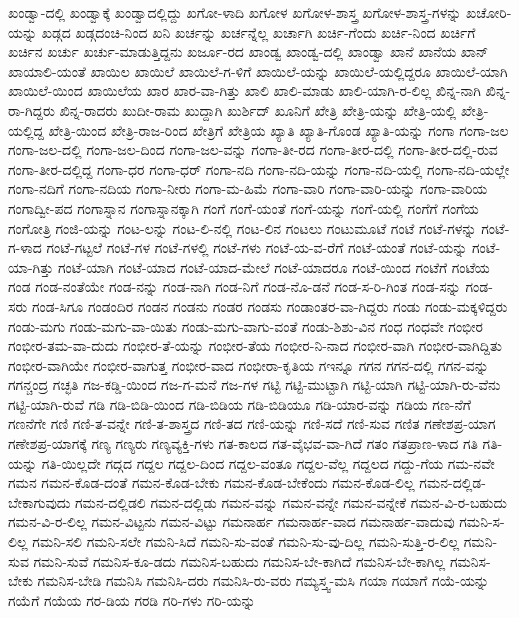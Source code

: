 {ಖಂಡ್ವಾ-ದಲ್ಲಿ
ಖಂಡ್ವಾಕ್ಕೆ
ಖಂಡ್ವಾದಲ್ಲಿದ್ದು
ಖಗೋ-ಳಾದಿ
ಖಗೋಳ
ಖಗೋಳ-ಶಾಸ್ತ್ರ
ಖಗೋಳ-ಶಾಸ್ತ್ರ-ಗಳನ್ನು
ಖಚೋರಿ-ಯನ್ನು
ಖಡ್ಗದ
ಖಡ್ಗದಂಚಿ-ನಿಂದ
ಖನಿ
ಖರ್ಚನ್ನು
ಖರ್ಚನ್ನೆಲ್ಲ
ಖರ್ಚಾಗಿ
ಖರ್ಚಿ-ಗೆಂದು
ಖರ್ಚಿ-ನಿಂದ
ಖರ್ಚಿಗೆ
ಖರ್ಚಿನ
ಖರ್ಚು
ಖರ್ಚು-ಮಾಡುತ್ತಿದ್ದನು
ಖರ್ಜೂ-ರದ
ಖಾಂಡ್ವ
ಖಾಂಡ್ವ-ದಲ್ಲಿ
ಖಾಂಡ್ವಾ
ಖಾನೆ
ಖಾನೆಯ
ಖಾನ್
ಖಾಯಾಲಿ-ಯಂತೆ
ಖಾಯಿಲ
ಖಾಯಿಲೆ
ಖಾಯಿಲೆ-ಗ-ಳಿಗೆ
ಖಾಯಿಲೆ-ಯನ್ನು
ಖಾಯಿಲೆ-ಯಲ್ಲಿದ್ದರೂ
ಖಾಯಿಲೆ-ಯಾಗಿ
ಖಾಯಿಲೆ-ಯಿಂದ
ಖಾಯಿಲೆಯ
ಖಾರ
ಖಾರ-ವಾ-ಗಿತ್ತು
ಖಾಲಿ
ಖಾಲಿ-ಮಾಡು
ಖಾಲಿ-ಯಾಗಿ-ರ-ಲಿಲ್ಲ
ಖಿನ್ನ-ನಾಗಿ
ಖಿನ್ನ-ರಾ-ಗಿದ್ದರು
ಖಿನ್ನ-ರಾದರು
ಖುದೀ-ರಾಮ
ಖುದ್ದಾಗಿ
ಖುರ್ಶಿದ್
ಖೂನಿಗೆ
ಖೇತ್ರಿ
ಖೇತ್ರಿ-ಯನ್ನು
ಖೇತ್ರಿ-ಯಲ್ಲಿ
ಖೇತ್ರಿ-ಯಲ್ಲಿದ್ದ
ಖೇತ್ರಿ-ಯಿಂದ
ಖೇತ್ರಿ-ರಾಜ-ರಿಂದ
ಖೇತ್ರಿಗೆ
ಖೇತ್ರಿಯ
ಖ್ಯಾತಿ
ಖ್ಯಾತಿ-ಗೊಂಡ
ಖ್ಯಾತಿ-ಯನ್ನು
ಗಂಗಾ
ಗಂಗಾ-ಜಲ
ಗಂಗಾ-ಜಲ-ದಲ್ಲಿ
ಗಂಗಾ-ಜಲ-ದಿಂದ
ಗಂಗಾ-ಜಲ-ವನ್ನು
ಗಂಗಾ-ತೀ-ರದ
ಗಂಗಾ-ತೀರ-ದಲ್ಲಿ
ಗಂಗಾ-ತೀರ-ದಲ್ಲಿ-ರುವ
ಗಂಗಾ-ತೀರ-ದಲ್ಲಿದ್ದ
ಗಂಗಾ-ಧರ
ಗಂಗಾ-ಧರ್
ಗಂಗಾ-ನದಿ
ಗಂಗಾ-ನದಿ-ಯನ್ನು
ಗಂಗಾ-ನದಿ-ಯಲ್ಲಿ
ಗಂಗಾ-ನದಿ-ಯಲ್ಲೇ
ಗಂಗಾ-ನದಿಗೆ
ಗಂಗಾ-ನದಿಯ
ಗಂಗಾ-ನೀರು
ಗಂಗಾ-ಮ-ಹಿಮೆ
ಗಂಗಾ-ವಾರಿ
ಗಂಗಾ-ವಾರಿ-ಯನ್ನು
ಗಂಗಾ-ವಾರಿಯ
ಗಂಗಾದ್ವೀ-ಪದ
ಗಂಗಾಸ್ನಾನ
ಗಂಗಾಸ್ನಾನಕ್ಕಾಗಿ
ಗಂಗೆ
ಗಂಗೆ-ಯಂತೆ
ಗಂಗೆ-ಯನ್ನು
ಗಂಗೆ-ಯಲ್ಲಿ
ಗಂಗೆಗೆ
ಗಂಗೆಯ
ಗಂಗೋತ್ರಿ
ಗಂಜಿ-ಯನ್ನು
ಗಂಟ-ಲನ್ನು
ಗಂಟ-ಲಿ-ನಲ್ಲಿ
ಗಂಟ-ಲಿನ
ಗಂಟಲು
ಗಂಟುಮೂಟೆ
ಗಂಟೆ
ಗಂಟೆ-ಗಳನ್ನು
ಗಂಟೆ-ಗ-ಳಾದ
ಗಂಟೆ-ಗಟ್ಟಲೆ
ಗಂಟೆ-ಗಳ
ಗಂಟೆ-ಗಳಲ್ಲಿ
ಗಂಟೆ-ಗಳು
ಗಂಟೆ-ಯ-ವ-ರೆಗೆ
ಗಂಟೆ-ಯಂತೆ
ಗಂಟೆ-ಯನ್ನು
ಗಂಟೆ-ಯಾ-ಗಿತ್ತು
ಗಂಟೆ-ಯಾಗಿ
ಗಂಟೆ-ಯಾದ
ಗಂಟೆ-ಯಾದ-ಮೇಲೆ
ಗಂಟೆ-ಯಾದರೂ
ಗಂಟೆ-ಯಿಂದ
ಗಂಟೆಗೆ
ಗಂಟೆಯ
ಗಂಡ
ಗಂಡ-ನಂತೆಯೇ
ಗಂಡ-ನನ್ನು
ಗಂಡ-ನಾಗಿ
ಗಂಡ-ನಿಗೆ
ಗಂಡ-ನೊ-ಡನೆ
ಗಂಡ-ಸ-ರಿ-ಗಿಂತ
ಗಂಡ-ಸನ್ನು
ಗಂಡ-ಸರು
ಗಂಡ-ಸಿಗೂ
ಗಂಡಂದಿರ
ಗಂಡನ
ಗಂಡನು
ಗಂಡರ
ಗಂಡಸು
ಗಂಡಾಂತರ-ವಾ-ಗಿದ್ದರು
ಗಂಡು
ಗಂಡು-ಮಕ್ಕಳಿದ್ದರು
ಗಂಡು-ಮಗು
ಗಂಡು-ಮಗು-ವಾ-ಯಿತು
ಗಂಡು-ಮಗು-ವಾಗು-ವಂತೆ
ಗಂಡು-ಶಿಶು-ವಿನ
ಗಂಧ
ಗಂಧವೇ
ಗಂಭೀರ
ಗಂಭೀರ-ತಮ-ವಾ-ದುದು
ಗಂಭೀರ-ತೆ-ಯನ್ನು
ಗಂಭೀರ-ತೆಯ
ಗಂಭೀರ-ನಿ-ನಾದ
ಗಂಭೀರ-ವಾಗಿ
ಗಂಭೀರ-ವಾಗಿದ್ದಿತು
ಗಂಭೀರ-ವಾಗಿಯೇ
ಗಂಭೀರ-ವಾಗುತ್ತ
ಗಂಭೀರ-ವಾದ
ಗಂಭೀರಾ-ಕೃತಿಯ
ಗಇನ್ನೂ
ಗಗನ
ಗಗನ-ದಲ್ಲಿ
ಗಗನ-ವನ್ನು
ಗಗನ್ಚಂದ್ರ
ಗಚ್ಛತಿ
ಗಜ-ಕಡ್ಡಿ-ಯಿಂದ
ಗಜ-ಗ-ಮನೆ
ಗಜ-ಗಳ
ಗಟ್ಟಿ
ಗಟ್ಟಿ-ಮುಟ್ಟಾಗಿ
ಗಟ್ಟಿ-ಯಾಗಿ
ಗಟ್ಟಿ-ಯಾಗಿ-ರು-ವೆನು
ಗಟ್ಟಿ-ಯಾಗಿ-ರುವೆ
ಗಡಿ
ಗಡಿ-ಬಿಡಿ-ಯಿಂದ
ಗಡಿ-ಬಿಡಿಯ
ಗಡಿ-ಬಿಡಿಯೂ
ಗಡಿ-ಯಾರ-ವನ್ನು
ಗಡಿಯ
ಗಣ-ನೆಗೆ
ಗಣನೆಗೇ
ಗಣಿ
ಗಣಿ-ತ-ವನ್ನೇ
ಗಣಿ-ತ-ಶಾಸ್ತ್ರದ
ಗಣಿ-ತದ
ಗಣಿ-ಯನ್ನು
ಗಣಿ-ಸದೆ
ಗಣಿ-ಸುವ
ಗಣಿತ
ಗಣೇಶಪ್ರ-ಯಾಗ
ಗಣೇಶಪ್ರ-ಯಾಗಕ್ಕೆ
ಗಣ್ಯ
ಗಣ್ಯರು
ಗಣ್ಯವ್ಯಕ್ತಿ-ಗಳು
ಗತ-ಕಾಲದ
ಗತ-ವೈಭವ-ವಾ-ಗಿದೆ
ಗತಂ
ಗತಪ್ರಾಣ-ಳಾದ
ಗತಿ
ಗತಿ-ಯನ್ನು
ಗತಿ-ಯಿಲ್ಲದೇ
ಗದ್ಗದ
ಗದ್ದಲ
ಗದ್ದಲ-ದಿಂದ
ಗದ್ದಲ-ವಂತೂ
ಗದ್ದಲ-ವೆಲ್ಲ
ಗದ್ದಲದ
ಗದ್ದು-ಗೆಯ
ಗಮ-ನವೇ
ಗಮನ
ಗಮನ-ಕೊಡ-ದಂತೆ
ಗಮನ-ಕೊಡ-ಬೇಕು
ಗಮನ-ಕೊಡ-ಬೇಕೆಂದು
ಗಮನ-ಕೊಡ-ಲಿಲ್ಲ
ಗಮನ-ದಲ್ಲಿಡ-ಬೇಕಾಗುವುದು
ಗಮನ-ದಲ್ಲಿಡಲಿ
ಗಮನ-ದಲ್ಲಿಡು
ಗಮನ-ವನ್ನು
ಗಮನ-ವನ್ನೇ
ಗಮನ-ವನ್ನೇಕೆ
ಗಮನ-ವಿ-ರ-ಬಹುದು
ಗಮನ-ವಿ-ರ-ಲಿಲ್ಲ
ಗಮನ-ವಿಟ್ಟನು
ಗಮನ-ವಿಟ್ಟು
ಗಮನಾರ್ಹ
ಗಮನಾರ್ಹ-ವಾದ
ಗಮನಾರ್ಹ-ವಾದುವು
ಗಮನಿ-ಸ-ಲಿಲ್ಲ
ಗಮನಿ-ಸಲಿ
ಗಮನಿ-ಸಲೇ
ಗಮನಿ-ಸಿದೆ
ಗಮನಿ-ಸು-ವಂತೆ
ಗಮನಿ-ಸು-ವು-ದಿಲ್ಲ
ಗಮನಿ-ಸುತ್ತಿ-ರ-ಲಿಲ್ಲ
ಗಮನಿ-ಸುವ
ಗಮನಿ-ಸುವೆ
ಗಮನಿಸ-ಕೂ-ಡದು
ಗಮನಿಸ-ಬಹುದು
ಗಮನಿಸ-ಬೇ-ಕಾಗಿದೆ
ಗಮನಿಸ-ಬೇ-ಕಾಗಿಲ್ಲ
ಗಮನಿಸ-ಬೇಕು
ಗಮನಿಸ-ಬೇಡಿ
ಗಮನಿಸಿ
ಗಮನಿಸಿ-ದರು
ಗಮನಿಸಿ-ರು-ವರು
ಗಮ್ಯಸ್ತ್ವ-ಮಸಿ
ಗಯಾ
ಗಯಾಗೆ
ಗಯೆ-ಯನ್ನು
ಗಯೆಗೆ
ಗಯೆಯ
ಗರ-ಡಿಯ
ಗರಡಿ
ಗರಿ-ಗಳು
ಗರಿ-ಯನ್ನು
}
